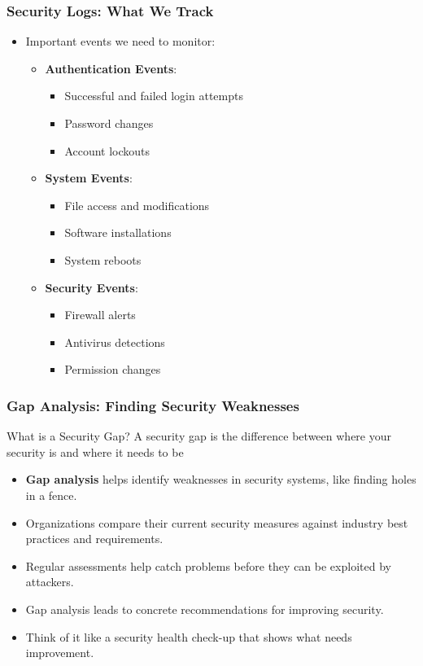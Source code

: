 \documentclass{beamer}
\begin{document}
\begin{frame}
    \frametitle{Security Logs: What We Track}
    \begin{itemize}
        \item Important events we need to monitor:
            \begin{itemize}
                \item \textbf{Authentication Events}:
                    \begin{itemize}
                        \item Successful and failed login attempts
                        \item Password changes
                        \item Account lockouts
                    \end{itemize}
                \item \textbf{System Events}:
                    \begin{itemize}
                        \item File access and modifications
                        \item Software installations
                        \item System reboots
                    \end{itemize}
                \item \textbf{Security Events}:
                    \begin{itemize}
                        \item Firewall alerts
                        \item Antivirus detections
                        \item Permission changes
                    \end{itemize}
            \end{itemize}
    \end{itemize}
\end{frame}

\begin{frame}
    \frametitle{Gap Analysis: Finding Security Weaknesses}
    \begin{block}{What is a Security Gap?}
        A security gap is the difference between where your security is and where it needs to be
    \end{block}
    \begin{itemize}
        \item \textbf{Gap analysis} helps identify weaknesses in security systems, like finding holes in a fence.
        \item Organizations compare their current security measures against industry best practices and requirements.
        \item Regular assessments help catch problems before they can be exploited by attackers.
        \item Gap analysis leads to concrete recommendations for improving security.
        \item Think of it like a security health check-up that shows what needs improvement.
    \end{itemize}
\end{frame}
\end{document}
